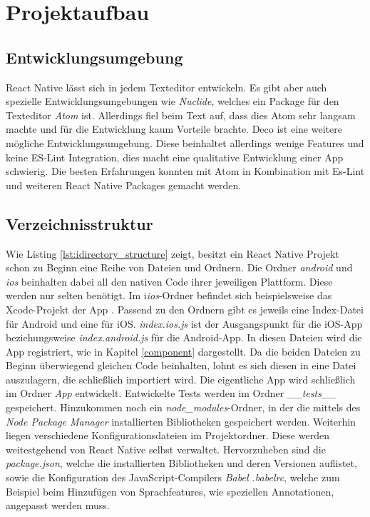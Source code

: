 \section{Projektaufbau}

\subsection{Entwicklungsumgebung}
React Native lässt sich in jedem Texteditor entwickeln. Es gibt aber auch spezielle Entwicklungsumgebungen wie \textit{Nuclide}, welches ein Package für den Texteditor \textit{Atom} ist. Allerdings fiel beim Text auf, dass dies Atom sehr langsam machte und für die Entwicklung kaum Vorteile brachte. Deco ist eine weitere mögliche Entwicklungsumgebung. Diese beinhaltet allerdings wenige Features und keine ES-Lint Integration, dies macht eine qualitative Entwicklung einer App schwierig. Die besten Erfahrungen konnten mit Atom in Kombination mit Es-Lint und weiteren React Native Packages gemacht werden. 

\subsection{Verzeichnisstruktur}
Wie Listing \ref{lst:idirectory_structure} zeigt, besitzt ein React Native Projekt schon zu Beginn eine Reihe von Dateien und Ordnern.
Die Ordner \textit{android} und \textit{ios} beinhalten dabei all den nativen Code ihrer jeweiligen Plattform. Diese werden nur selten benötigt. Im i\textit{ios}-Ordner befindet sich beispielsweise das Xcode-Projekt der App \cite{carli_project_2016}. Passend zu den Ordnern gibt es jeweils eine Index-Datei für Android und eine für iOS. \textit{index.ios.js} ist der Ausgangspunkt für die iOS-App beziehungsweise \textit{index.android.js} für die Android-App. In diesen Dateien wird die App registriert, wie in Kapitel \ref{component} dargestellt. Da die beiden Dateien zu Beginn überwiegend gleichen Code beinhalten, lohnt es sich diesen in eine Datei auszulagern, die schließlich importiert wird. Die eigentliche App wird schließlich im Ordner \textit{App} entwickelt. Entwickelte Tests werden im Ordner \textit{\_\_tests\_\_} gespeichert. Hinzukommen noch ein \textit{node\_modules}-Ordner, in der die mittels des \textit{Node Package Manager} installierten Bibliotheken gespeichert werden. Weiterhin liegen verschiedene Konfigurationsdateien im Projektordner. Diese werden weitestgehend von React Native selbst verwaltet. Hervorzuheben sind die \textit{package.json}, welche die installierten Bibliotheken und deren Versionen auflistet, sowie die Konfiguration des JavaScript-Compilers \textit{Babel .babelrc}, welche zum Beispiel beim Hinzufügen von Sprachfeatures, wie speziellen Annotationen, angepasst werden muss. 


